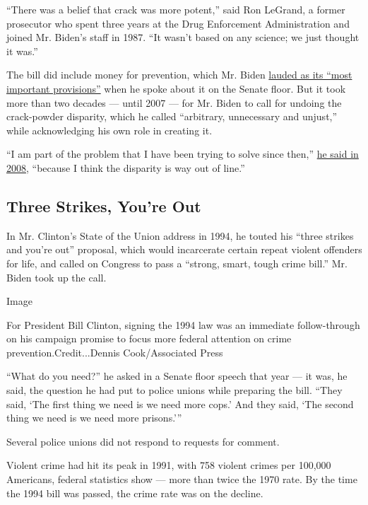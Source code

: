 ``There was a belief that crack was more potent,'' said Ron LeGrand, a
former prosecutor who spent three years at the Drug Enforcement
Administration and joined Mr. Biden's staff in 1987. ``It wasn't based
on any science; we just thought it was.''

The bill did include money for prevention, which Mr. Biden
\href{https://www.ncjrs.gov/pdffiles1/Digitization/128804NCJRS.pdf}{lauded
as its ``most important provisions''} when he spoke about it on the
Senate floor. But it took more than two decades --- until 2007 --- for
Mr. Biden to call for undoing the crack-powder disparity, which he
called ``arbitrary, unnecessary and unjust,'' while acknowledging his
own role in creating it.

``I am part of the problem that I have been trying to solve since
then,''
\href{https://www.govinfo.gov/content/pkg/CHRG-110shrg46050/html/CHRG-110shrg46050.htm}{he
said in 2008}, ``because I think the disparity is way out of line.''

\hypertarget{three-strikes-youre-out}{%
\subsection{Three Strikes, You're Out}\label{three-strikes-youre-out}}

In Mr. Clinton's State of the Union address in 1994, he touted his
``three strikes and you're out'' proposal, which would incarcerate
certain repeat violent offenders for life, and called on Congress to
pass a ``strong, smart, tough crime bill.'' Mr. Biden took up the call.

Image

For President Bill Clinton, signing the 1994 law was an immediate
follow-through on his campaign promise to focus more federal attention
on crime prevention.Credit...Dennis Cook/Associated Press

``What do you need?'' he asked in a Senate floor speech that year --- it
was, he said, the question he had put to police unions while preparing
the bill. ``They said, `The first thing we need is we need more cops.'
And they said, `The second thing we need is we need more prisons.'''

Several police unions did not respond to requests for comment.

Violent crime had hit its peak in 1991, with 758 violent crimes per
100,000 Americans, federal statistics show --- more than twice the 1970
rate. By the time the 1994 bill was passed, the crime rate was on the
decline.

